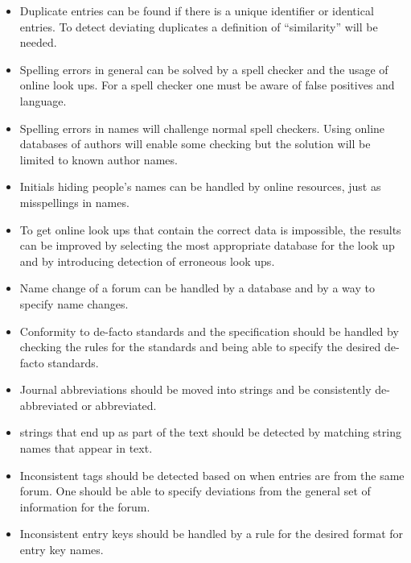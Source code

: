 \begin{itemize}
\item Duplicate entries can be found if there is a unique identifier
  or identical entries.  To detect deviating duplicates a definition
  of ``similarity'' will be needed.

\item Spelling errors in general can be solved by a spell checker and
  the usage of online look ups.  For a spell checker one must be aware
  of false positives and language.

\item Spelling errors in names will challenge normal spell checkers.
  Using online databases of authors will enable some checking but the
  solution will be limited to known author names.

\item Initials hiding people's names can be handled by online
  resources, just as misspellings in names.

\item To get online look ups that contain the correct data is
  impossible, the results can be improved by selecting the most
  appropriate database for the look up and by introducing detection of
  erroneous look ups.

\item Name change of a forum can be handled by a database and by a way
  to specify name changes.

\item Conformity to de-facto standards and the {\bibtex} specification
  should be handled by checking the rules for the standards and being
  able to specify the desired de-facto standards.

\item Journal abbreviations should be moved into strings and be
  consistently de-abbreviated or abbreviated.

\item {\bibtex} strings that end up as part of the text should be
  detected by matching string names that appear in text.

\item Inconsistent tags should be detected based on when entries are
  from the same forum.  One should be able to specify deviations from
  the general set of information for the forum.

\item Inconsistent entry keys should be handled by a rule for the
  desired format for entry key names.
\end{itemize}

